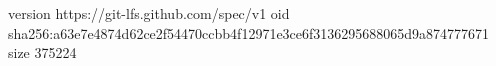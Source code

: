 version https://git-lfs.github.com/spec/v1
oid sha256:a63e7e4874d62ce2f54470ccbb4f12971e3ce6f3136295688065d9a874777671
size 375224
